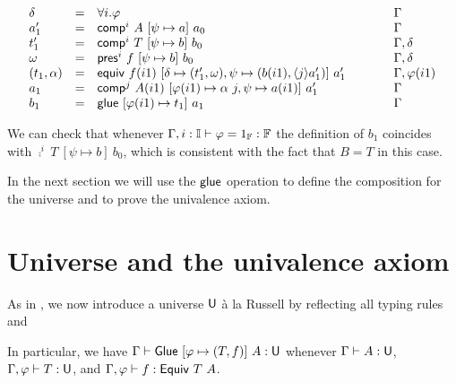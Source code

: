 \[ \begin{array}{lcll}
\delta & = & \forall i.\varphi & \hspace{1cm} \Gamma \\
a_1' & = & {\sf comp}^i~A~[\psi\mapsto a]~a_0 & \hspace{1cm} \Gamma \\
t_1' & = & {\sf comp}^i~T~[\psi\mapsto b]~b_0 & \hspace{1cm} \Gamma,\delta\\
\omega & = &{\sf pres}^{i}~f{}~[\psi\mapsto b]~b_0 & \hspace{1cm} \Gamma,\delta \\
(t_1,\alpha) & = & {\sf equiv}~f{}(i1)~[\delta \mapsto (t'_1,\omega),
                            \psi \mapsto (b(i1),{\langle}j{\rangle}a_1')]~a_1' & \hspace{1cm} \Gamma,\varphi(i1)\\
a_1 & = & {\sf comp}^j~A(i1)~[\varphi(i1)\mapsto \alpha~j,\psi\mapsto a(i1)]~a_1' & \hspace{1cm} \Gamma \\
b_1 & = & {\sf glue}~[\varphi(i1)\mapsto t_1]~a_1 & \hspace{1cm} \Gamma \\
\end{array} \]

We can check that whenever $\Gamma, i: \mathbb{I} \vdash \varphi = 1_{\mathbb{F}} : \mathbb{F}$
the definition of $b_1$ coincides with $\comp^i~T~[\psi\mapsto
b]~b_0$, which is consistent with the fact that $B = T$ in this case.

\medskip

In the next section we will use the ${\sf glue}$ operation to define the
composition for the universe and to prove the univalence axiom.



\section{Universe and the univalence axiom}\label{sec:universe}
As in \cite{MLTT72}, we now introduce a universe $\mathsf{U}$ \`a la Russell
by reflecting all typing rules and
%
In particular, we have $\Gamma \vdash {\sf Glue}~[\varphi \mapsto
(T,f{})]~A : \mathsf{U}$ whenever $\Gamma \vdash A : \mathsf{U}$, $\Gamma,\varphi \vdash
T : \mathsf{U}$, and $\Gamma, \varphi \vdash f{} : {\sf Equiv}~T~A$.

